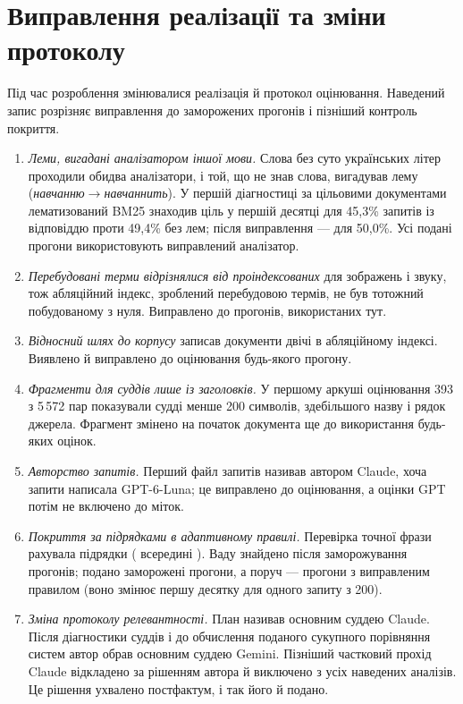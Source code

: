 \section{Виправлення реалізації та зміни протоколу}\label{sec:intro-history}
Під час розроблення змінювалися реалізація й протокол оцінювання. Наведений запис розрізняє виправлення до заморожених прогонів і пізніший контроль покриття.
\begin{enumerate}
\item \emph{Леми, вигадані аналізатором іншої мови.} Слова без суто українських літер проходили обидва аналізатори, і той, що не знав слова, вигадував лему (\emph{навчанню}$\to$\emph{навчаннить}). У першій діагностиці за цільовими документами лематизований BM25 знаходив ціль у першій десятці для 45,3\% запитів із відповіддю проти 49,4\% без лем; після виправлення --- для 50,0\%. Усі подані прогони використовують виправлений аналізатор.
\item \emph{Перебудовані терми відрізнялися від проіндексованих} для зображень і звуку, тож абляційний індекс, зроблений перебудовою термів, не був тотожний побудованому з нуля. Виправлено до прогонів, використаних тут.
\item \emph{Відносний шлях до корпусу} записав документи двічі в абляційному індексі. Виявлено й виправлено до оцінювання будь-якого прогону.
\item \emph{Фрагменти для суддів лише із заголовків.} У першому аркуші оцінювання 393 з 5\,572 пар показували судді менше 200 символів, здебільшого назву і рядок джерела. Фрагмент змінено на початок документа ще до використання будь-яких оцінок.
\item \emph{Авторство запитів.} Перший файл запитів називав автором Claude, хоча запити написала GPT-6-Luna; це виправлено до оцінювання, а оцінки GPT потім не включено до міток.
\item \emph{Покриття за підрядками в адаптивному правилі.} Перевірка точної фрази рахувала підрядки ( всередині ). Ваду знайдено після заморожування прогонів; подано заморожені прогони, а поруч --- прогони з виправленим правилом (воно змінює першу десятку для одного запиту з 200).
\item \emph{Зміна протоколу релевантності.} План називав основним суддею Claude. Після діагностики суддів і до обчислення поданого сукупного порівняння систем автор обрав основним суддею Gemini. Пізніший частковий прохід Claude відкладено за рішенням автора й виключено з усіх наведених аналізів. Це рішення ухвалено постфактум, і так його й подано.
\end{enumerate}
